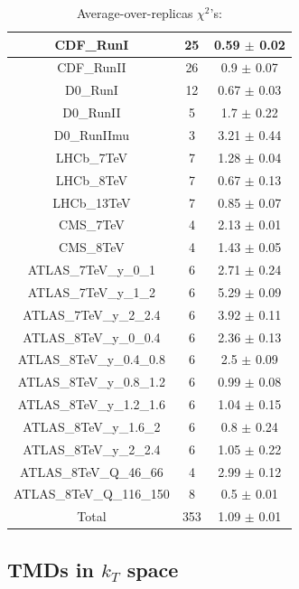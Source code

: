 \documentclass[
]{article}
\begin{document}
\begin{table}[h]
\begin{tabular}{|c|c|c|}
CDF\_RunI & 25 & 0.59 \(\pm\) 0.02 \\ \hline
CDF\_RunII & 26 & 0.9 \(\pm\) 0.07 \\ \hline
D0\_RunI & 12 & 0.67 \(\pm\) 0.03 \\ \hline
D0\_RunII & 5 & 1.7 \(\pm\) 0.22 \\ \hline
D0\_RunIImu & 3 & 3.21 \(\pm\) 0.44 \\ \hline
LHCb\_7TeV & 7 & 1.28 \(\pm\) 0.04 \\ \hline
LHCb\_8TeV & 7 & 0.67 \(\pm\) 0.13 \\ \hline
LHCb\_13TeV & 7 & 0.85 \(\pm\) 0.07 \\ \hline
CMS\_7TeV & 4 & 2.13 \(\pm\) 0.01 \\ \hline
CMS\_8TeV & 4 & 1.43 \(\pm\) 0.05 \\ \hline
ATLAS\_7TeV\_y\_0\_1 & 6 & 2.71 \(\pm\) 0.24 \\ \hline
ATLAS\_7TeV\_y\_1\_2 & 6 & 5.29 \(\pm\) 0.09 \\ \hline
ATLAS\_7TeV\_y\_2\_2.4 & 6 & 3.92 \(\pm\) 0.11 \\ \hline
ATLAS\_8TeV\_y\_0\_0.4 & 6 & 2.36 \(\pm\) 0.13 \\ \hline
ATLAS\_8TeV\_y\_0.4\_0.8 & 6 & 2.5 \(\pm\) 0.09 \\ \hline
ATLAS\_8TeV\_y\_0.8\_1.2 & 6 & 0.99 \(\pm\) 0.08 \\ \hline
ATLAS\_8TeV\_y\_1.2\_1.6 & 6 & 1.04 \(\pm\) 0.15 \\ \hline
ATLAS\_8TeV\_y\_1.6\_2 & 6 & 0.8 \(\pm\) 0.24 \\ \hline
ATLAS\_8TeV\_y\_2\_2.4 & 6 & 1.05 \(\pm\) 0.22 \\ \hline
ATLAS\_8TeV\_Q\_46\_66 & 4 & 2.99 \(\pm\) 0.12 \\ \hline
ATLAS\_8TeV\_Q\_116\_150 & 8 & 0.5 \(\pm\) 0.01 \\ \hline
Total & 353 & 1.09 \(\pm\) 0.01 \\ \hline

\end{tabular}

\caption{Average-over-replicas \(\chi^2\)'s:}

\end{table}

\hypertarget{tmds-in-k_t-space}{%
\subsection{\texorpdfstring{TMDs in \(k_T\)
space}{TMDs in k\_T space}}\label{tmds-in-k_t-space}}
\end{document}
